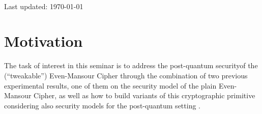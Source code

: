 \documentclass[12pt]{article}
\begin{document}
\begin{titlepage}
\begin{minipage}{0.75\textwidth}
    \end{minipage}\\[2cm]
    \vspace{-1cm}    
    
    
    {\large{Last updated: \today}}\\[2cm] %
    
    \vfill %

    \end{titlepage}

    \clearpage

    
    \section{Motivation}
    \label{sec:motivation}

    The task of interest in this seminar is to address the post-quantum security\break of the (``tweakable'') Even-Mansour Cipher through the combination of two previous experimental results, one of them on the security model of the plain Even-Mansour Cipher, as well as how to build variants of this cryptographic primitive considering also security models for the post-quantum setting \cite{alagic-et-al:post-quantum-security-tweakable-even-mansour-applications:2022:03-2024}.
    
\end{document}
